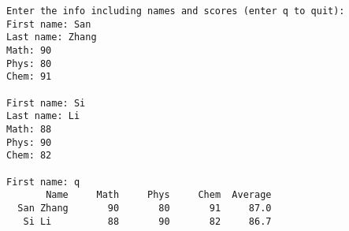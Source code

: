 \begin{frame}[fragile]\ft{\subsecname}
\begin{lstlisting}[frame=no,basicstyle=\ttfamily\footnotesize]
Enter the info including names and scores (enter q to quit): 
First name: San
Last name: Zhang
Math: 90
Phys: 80
Chem: 91

First name: Si
Last name: Li
Math: 88
Phys: 90
Chem: 82

First name: q
       Name     Math     Phys     Chem  Average
  San Zhang       90       80       91     87.0
   Si Li          88       90       82     86.7
\end{lstlisting}
\end{frame}